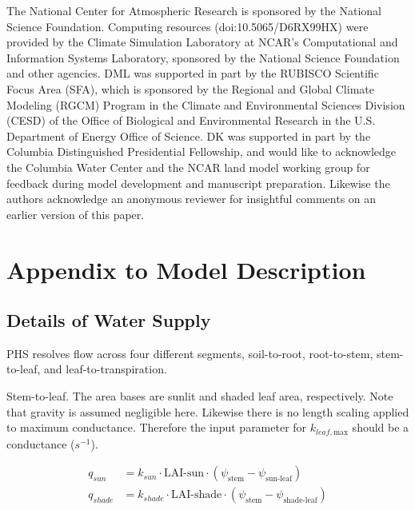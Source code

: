 \documentclass[draft,linenumbers]{agujournal}
\begin{document}
The National Center for Atmospheric Research is sponsored by the National Science Foundation. Computing resources (doi:10.5065/D6RX99HX) were provided by the Climate Simulation Laboratory at NCAR's Computational and Information Systems Laboratory, sponsored by the National Science Foundation and other agencies. DML was supported in part by the RUBISCO Scientific Focus Area (SFA), which is sponsored by the Regional and Global Climate Modeling (RGCM) Program in the Climate and Environmental Sciences Division (CESD) of the Office of Biological and Environmental Research in the U.S. Department of Energy Office of Science. DK was supported in part by the Columbia Distinguished Presidential Fellowship, and would like to acknowledge the Columbia Water Center and the NCAR land model working group for feedback during model development and manuscript preparation. Likewise the authors acknowledge an anonymous reviewer for insightful comments on an earlier version of this paper.


\clearpage    

\clearpage

\appendix


\section{Appendix to Model Description}

\subsection{Details of Water Supply}

PHS resolves flow across four different segments, soil-to-root, root-to-stem, stem-to-leaf, and leaf-to-transpiration.

Stem-to-leaf. The area bases are sunlit and shaded leaf area, respectively. 
Note that gravity is assumed negligible here. 
Likewise there is no length scaling applied to maximum conductance. 
Therefore the input parameter for $k_{leaf,\text{max}}$ should be a conductance ($s^{-1}$).

\begin{linenomath*} \begin{equation} \begin{aligned}
q_{sun} &= k_{sun} \cdot \text{LAI-sun}  \cdot \left( \psi_{\text{stem}}-\psi_{\text{sun-leaf}}\right) \\
q_{shade} &= k_{shade} \cdot \text{LAI-shade} \cdot  \left( \psi_{\text{stem}}-\psi_{\text{shade-leaf}}\right)
\end{aligned} \end{equation} \end{linenomath*}
\end{document}
